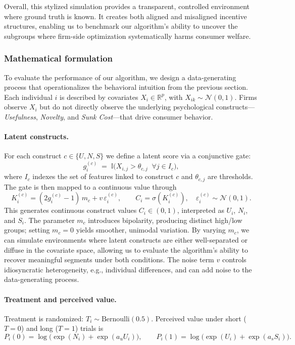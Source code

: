\documentclass[11pt,letterpaper,english]{article}
\begin{document}
Overall, this stylized simulation provides a transparent, controlled environment where ground truth is known. It creates both aligned and misaligned incentive structures, enabling us to benchmark our algorithm’s ability to uncover the subgroups where firm-side optimization systematically harms consumer welfare.


\subsubsection{Mathematical formulation}

To evaluate the performance of our algorithm, we design a data-generating process that operationalizes the behavioral intuition from the previous section. Each individual $i$ is described by covariates $X_i \in \mathbb{R}^p$, with $X_{ik} \sim \mathcal{N}(0,1)$. Firms observe $X_i$ but do not directly observe the underlying psychological constructs---\emph{Usefulness}, \emph{Novelty}, and \emph{Sunk Cost}---that drive consumer behavior.

\paragraph{Latent constructs.}
For each construct $c \in \{U,N,S\}$ we define a latent score via a conjunctive gate:
\[
g_i^{(c)} \;=\; \mathbb{I}\!\Big( X_{i,j} > \theta_{c,j} \;\;\forall j \in I_c \Big),
\]
where $I_c$ indexes the set of features linked to construct $c$ and $\theta_{c,j}$ are thresholds. The gate is then mapped to a continuous value through
\[
K_i^{(c)} = (2g_i^{(c)}-1)\, m_c + v \,\varepsilon_i^{(c)}, 
\qquad
C_i = \sigma(K_i^{(c)}), \quad \varepsilon_i^{(c)} \sim \mathcal{N}(0,1).
\]
This generates continuous construct values $C_i \in (0,1)$, interpreted as $U_i$, $N_i$, and $S_i$. The parameter $m_c$ introduces bipolarity, producing distinct high/low groups; setting $m_c=0$ yields smoother, unimodal variation. By varying $m_c$, we can simulate environments where latent constructs are either well-separated or diffuse in the covariate space, allowing us to evaluate the algorithm’s ability to recover meaningful segments under both conditions. The noise term $v$ controls idiosyncratic heterogeneity, e.g., individual differences, and can add noise to the data-generating process.

\paragraph{Treatment and perceived value.}
Treatment is randomized: $T_i \sim \text{Bernoulli}(0.5)$. Perceived value under short ($T=0$) and long ($T=1$) trials is
\[
P_i(0) = \log\!\big(\exp(N_i) + \exp(a_u U_i)\big), 
\qquad
P_i(1) = \log\!\big(\exp(U_i) + \exp(a_s S_i)\big).
\]
\end{document}

